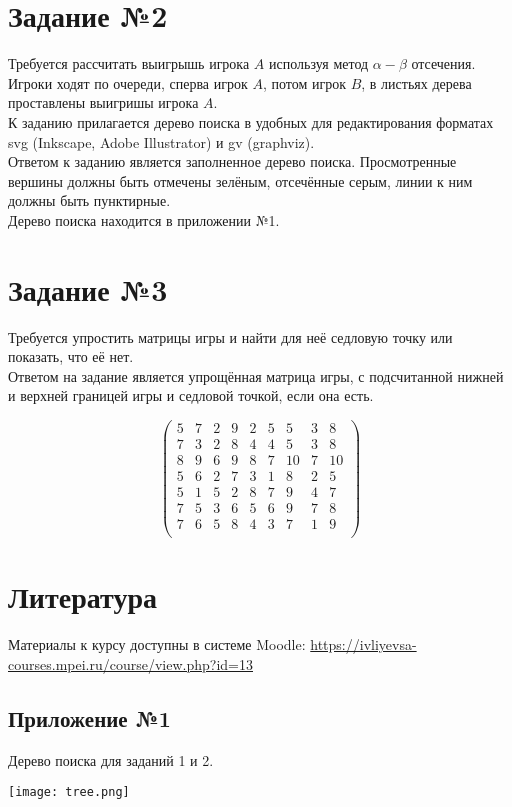 \documentclass{article}
\begin{document}
\section{Задание №2}

Требуется рассчитать выигрышь игрока $A$ используя метод $\alpha-\beta$ отсечения. \\
Игроки ходят по очереди, сперва игрок $A$, потом игрок $B$, в листьях дерева проставлены выигришы игрока $A$.\\
К заданию прилагается дерево поиска в удобных для редактирования форматах svg (Inkscape, Adobe Illustrator) и 
gv (graphviz). \\
Ответом к заданию является заполненное дерево поиска. Просмотренные вершины должны быть отмечены зелёным, 
отсечённые серым, линии к ним должны быть пунктирные. \\
Дерево поиска находится в приложении №1.

\section{Задание №3}

Требуется упростить матрицы игры и найти для неё седловую точку или показать, что её нет.\\
Ответом на задание является упрощённая матрица игры, с подсчитанной нижней и верхней границей игры и
седловой точкой, если она есть.

$$\begin{pmatrix}
5 &7 &2 &9 &2 &5 &5 &3 &8\\
7 &3 &2 &8 &4 &4 &5 &3 &8\\
8 &9 &6 &9 &8 &7 &10 &7 &10\\
5 &6 &2 &7 &3 &1 &8 &2 &5\\
5 &1 &5 &2 &8 &7 &9 &4 &7\\
7 &5 &3 &6 &5 &6 &9 &7 &8\\
7 &6 &5 &8 &4 &3 &7 &1 &9\\

\end{pmatrix}$$

\section{Литература}

Материалы к курсу доступны в системе Moodle: \href{https://ivliyevsa-courses.mpei.ru/course/view.php?id=13
}{https://ivliyevsa-courses.mpei.ru/course/view.php?id=13}

\begin{landscape}
    \section{Приложение №1}

    Дерево поиска для заданий 1 и 2.

    \texttt{[image: tree.png]}
\end{landscape}
\end{document}
